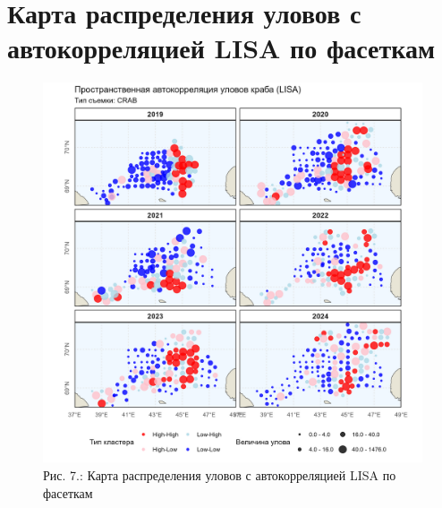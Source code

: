 \documentclass[
  letterpaper,
  DIV=11,
  numbers=noendperiod]{scrreprt}
\begin{document}
\section{Карта распределения уловов с автокорреляцией LISA по
фасеткам}\label{ux43aux430ux440ux442ux430-ux440ux430ux441ux43fux440ux435ux434ux435ux43bux435ux43dux438ux44f-ux443ux43bux43eux432ux43eux432-ux441-ux430ux432ux442ux43eux43aux43eux440ux440ux435ux43bux44fux446ux438ux435ux439-lisa-ux43fux43e-ux444ux430ux441ux435ux442ux43aux430ux43c}

\begin{figure}[H]

{\centering \includegraphics[width=0.8\linewidth,height=\textheight,keepaspectratio]{images/KARTOGRAPH7.jpg}

}

\caption{Рис. 7.: Карта распределения уловов с автокорреляцией LISA по
фасеткам}

\end{figure}%
\end{document}
